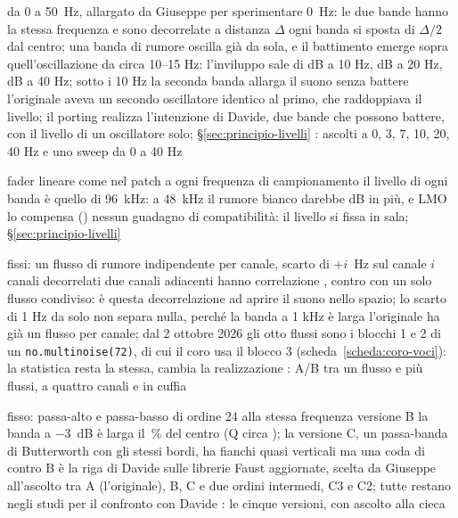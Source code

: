 {da 0 a \qty{50}{\hertz}, allargato da Giuseppe per sperimentare}
{\qty{0}{\hertz}: le due bande hanno la stessa frequenza e sono decorrelate}
{a distanza $\Delta$ ogni banda si sposta di $\Delta/2$ dal centro; una banda di rumore oscilla già da sola, e il battimento emerge sopra quell'oscillazione da circa 10--15 Hz: l'inviluppo sale di  dB a 10 Hz,  dB a 20 Hz,  dB a 40 Hz; sotto i 10 Hz la seconda banda allarga il suono senza battere}
{l'originale aveva un secondo oscillatore identico al primo, che raddoppiava il livello; il porting realizza l'intenzione di Davide, due bande che possono battere, con il livello di un oscillatore solo; \S\ref{sec:principio-livelli}}
{\daprovare}
{: ascolti a 0, 3, 7, 10, 20, 40 Hz e uno sweep da 0 a 40 Hz}

{fader lineare}
{come nel patch}
{a ogni frequenza di campionamento il livello di ogni banda è quello di \qty{96}{\kilo\hertz}: a \qty{48}{\kilo\hertz} il rumore bianco darebbe  dB in più, e LMO lo compensa ()}
{nessun guadagno di compatibilità: il livello si fissa in sala; \S\ref{sec:principio-livelli}}
{\daprovare}
{}

{fissi: un flusso di rumore indipendente per canale, scarto di $+i$~Hz sul canale $i$}
{canali decorrelati}
{due canali adiacenti hanno correlazione , contro  con un solo flusso condiviso: è questa decorrelazione ad aprire il suono nello spazio; lo scarto di 1 Hz da solo non separa nulla, perché la banda a 1 kHz è larga }
{l'originale ha già un flusso per canale; dal 2 ottobre 2026 gli otto flussi sono i blocchi 1 e 2 di un \texttt{no.multinoise(72)}, di cui il coro usa il blocco 3 (scheda~\ref{scheda:coro-voci}): la statistica resta la stessa, cambia la realizzazione}
{\deciso}
{: A/B tra un flusso e più flussi, a quattro canali e in cuffia}

{fisso: passa-alto e passa-basso di ordine 24 alla stessa frequenza}
{versione B}
{la banda a $-3$~dB è larga il \,\% del centro (Q circa ); la versione C, un passa-banda di Butterworth con gli stessi bordi, ha fianchi quasi verticali ma una coda di  contro }
{B è la riga di Davide sulle librerie Faust aggiornate, scelta da Giuseppe all'ascolto tra A (l'originale), B, C e due ordini intermedi, C3 e C2; tutte restano negli studi per il confronto con Davide}
{\daprovare}
{: le cinque versioni, con ascolto alla cieca}
